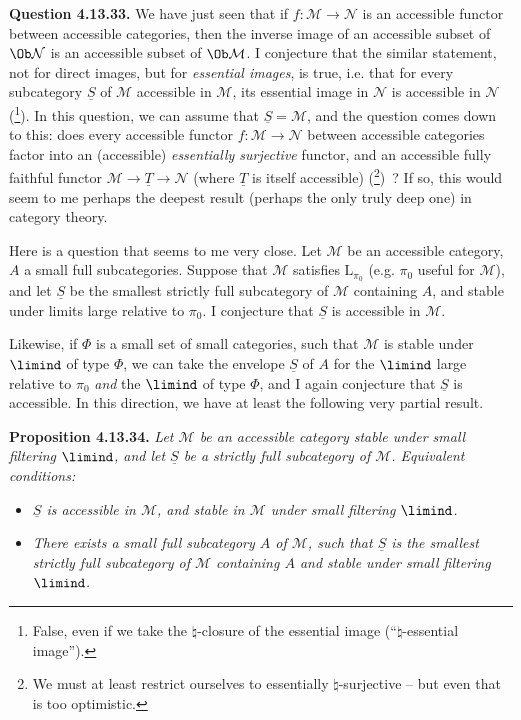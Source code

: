 \textbf{Question 4.13.33.} We have just seen that if $f : \mathcal{M} \longrightarrow \mathcal{N}$ is an accessible functor between accessible categories, then the inverse image of an accessible subset of $\Ob \mathcal{N}$ is an accessible subset of $\Ob \mathcal{M}$. I conjecture that the similar statement, not for direct images, but for \textit{essential images}, is
true, i.e. that for every subcategory $\underline{S}$ of $\mathcal{M}$ accessible in $\mathcal{M}$, its essential image in $\mathcal{N}$ is accessible in $\mathcal{N}$ (\footnote[156]{False, even if we take the $\natural$-closure of the essential image (``$\natural$-essential image'').}). In this question, we can assume that $\underline{S} = \mathcal{M}$, and the question comes down to this: does every accessible functor $f : \mathcal{M} \longrightarrow \mathcal{N}$ between accessible categories factor into an (accessible) \textit{essentially surjective} functor, and an accessible fully faithful functor $\mathcal{M} \longrightarrow \underline{T} \longrightarrow \mathcal{N}$ (where $\underline{T}$ is itself accessible) (\footnote[157]{We must at least restrict ourselves to essentially $\natural$-surjective – but even that is too optimistic.})~? If so, this would seem to me perhaps the deepest result (perhaps the only truly deep one) in category theory. %

Here is a question that seems to me very close. Let $\mathcal{M}$ be an accessible category, $A$ a small full subcategories. Suppose that $\mathcal{M}$ satisfies $\mathrm{L}_{\pi_0}$ (e.g. $\pi_0$ useful for $\mathcal{M}$), and let $\underline{S}$ be the smallest strictly full subcategory of $\mathcal{M}$ containing $A$, and stable under limits large relative to $\pi_0$. I conjecture that $\underline{S}$ is accessible in $\mathcal{M}$. %


Likewise, if $\Phi$ is a small set of small categories, such that $\mathcal{M}$ is stable under $\limind$ of type $\Phi$, we can take the envelope $\underline{S}$ of $A$ for the $\limind$ large relative to $\pi_0$ \textit{and} the
$\limind$ of type $\Phi$, and I again conjecture that $\underline{S}$ is accessible. In this direction, we have at least the following very partial result.

\textbf{Proposition 4.13.34.} \textit{Let $\mathcal{M}$ be an accessible category stable under small filtering $\limind$, and let $\underline{S}$ be a strictly full subcategory of $\mathcal{M}$. Equivalent conditions:}
\begin{itemize}[leftmargin=2.5em]
\item[\textit{a)}] \textit{$\underline{S}$ is accessible in $\mathcal{M}$, and stable in $\mathcal{M}$ under small filtering $\limind$.}
\item[\textit{b)}] \textit{There exists a small full subcategory $A$ of $\mathcal{M}$, such that $\underline{S}$ is the smallest strictly full subcategory of $\mathcal{M}$ containing $A$ and stable under small filtering $\limind$.}
\end{itemize}

